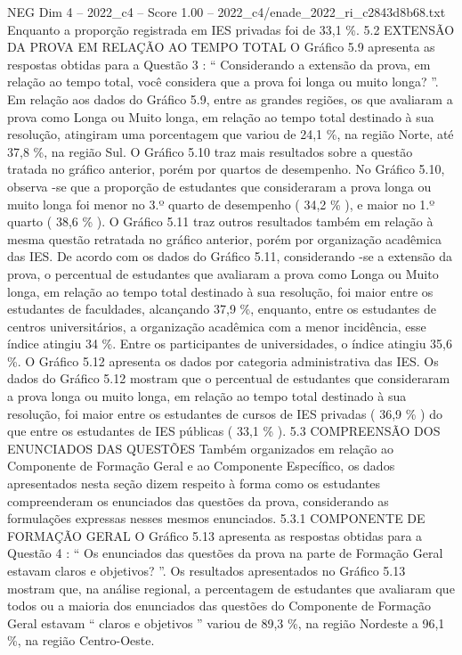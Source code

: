 \begin{textsample}{NEG Dim 4 – 2022\_c4 – Score 1.00 – 2022\_c4/enade\_2022\_ri\_c2843d8b68.txt}
Enquanto a proporção registrada em IES privadas foi de 33,1 \%. 5.2 EXTENSÃO DA PROVA EM RELAÇÃO AO TEMPO TOTAL O Gráfico 5.9 apresenta as respostas obtidas para a Questão 3 : “ Considerando a extensão da prova, em relação ao tempo total, você considera que a prova foi longa ou muito longa? ”.
Em relação aos dados do Gráfico 5.9, entre as grandes regiões, os que avaliaram a prova como Longa ou Muito longa, em relação ao tempo total destinado à sua resolução, atingiram uma porcentagem que variou de 24,1 \%, na região Norte, até 37,8 \%, na região Sul.
O Gráfico 5.10 traz mais resultados sobre a questão tratada no gráfico anterior, porém por quartos de desempenho.
No Gráfico 5.10, observa -se que a proporção de estudantes que consideraram a prova longa ou muito longa foi menor no 3.º quarto de desempenho ( 34,2 \% ), e maior no 1.º quarto ( 38,6 \% ).
O Gráfico 5.11 traz outros resultados também em relação à mesma questão retratada no gráfico anterior, porém por organização acadêmica das IES.
De acordo com os dados do Gráfico 5.11, considerando -se a extensão da prova, o percentual de estudantes que avaliaram a prova como Longa ou Muito longa, em relação ao tempo total destinado à sua resolução, foi maior entre os estudantes de faculdades, alcançando 37,9 \%, enquanto, entre os estudantes de centros universitários, a organização acadêmica com a menor incidência, esse índice atingiu 34 \%.
Entre os participantes de universidades, o índice atingiu 35,6 \%.
O Gráfico 5.12 apresenta os dados por categoria administrativa das IES.
Os dados do Gráfico 5.12 mostram que o percentual de estudantes que consideraram a prova longa ou muito longa, em relação ao tempo total destinado à sua resolução, foi maior entre os estudantes de cursos de IES privadas ( 36,9 \% ) do que entre os estudantes de IES públicas ( 33,1 \% ). 5.3 COMPREENSÃO DOS ENUNCIADOS DAS QUESTÕES Também organizados em relação ao Componente de Formação Geral e ao Componente Específico, os dados apresentados nesta seção dizem respeito à forma como os estudantes compreenderam os enunciados das questões da prova, considerando as formulações expressas nesses mesmos enunciados. 5.3.1 COMPONENTE DE FORMAÇÃO GERAL O Gráfico 5.13 apresenta as respostas obtidas para a Questão 4 : “ Os enunciados das questões da prova na parte de Formação Geral estavam claros e objetivos? ”.
Os resultados apresentados no Gráfico 5.13 mostram que, na análise regional, a percentagem de estudantes que avaliaram que todos ou a maioria dos enunciados das questões do Componente de Formação Geral estavam “ claros e objetivos ” variou de 89,3 \%, na região Nordeste a 96,1 \%, na região Centro-Oeste.

\end{textsample}
